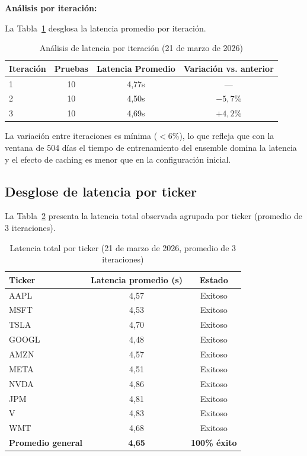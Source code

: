   \textbf{Análisis por iteración:}

  La Tabla~\ref{tab:iteraciones} desglosa la latencia promedio por iteración.

  \begin{table}[H]
  \centering
  \caption{Análisis de latencia por iteración (21 de marzo de 2026)}
  \label{tab:iteraciones}
  \begin{tabular}{lccc}
  \toprule
  \textbf{Iteración} & \textbf{Pruebas} & \textbf{Latencia Promedio} & \textbf{Variación vs.
  anterior} \\
  \midrule
  1 & 10 & 4{,}77s & --- \\
  2 & 10 & 4{,}50s & $-5{,}7\%$ \\
  3 & 10 & 4{,}69s & $+4{,}2\%$ \\
  \bottomrule
  \end{tabular}
  \end{table}

  La variación entre iteraciones es mínima ($<$6\%), lo que refleja que con la ventana de
  504 días el tiempo de entrenamiento del ensemble domina la latencia y el efecto de caching
  es menor que en la configuración inicial.

\subsection{Desglose de latencia por ticker}

  La Tabla~\ref{tab:latencia-componentes} presenta la latencia total observada agrupada por
  ticker (promedio de 3 iteraciones).

  \begin{table}[H]
  \centering
  \caption{Latencia total por ticker (21 de marzo de 2026, promedio de 3 iteraciones)}
  \label{tab:latencia-componentes}
  \begin{tabular}{lcc}
  \toprule
  \textbf{Ticker} & \textbf{Latencia promedio (s)} & \textbf{Estado} \\
  \midrule
  AAPL  & 4{,}57 & Exitoso \\
  MSFT  & 4{,}53 & Exitoso \\
  TSLA  & 4{,}70 & Exitoso \\
  GOOGL & 4{,}48 & Exitoso \\
  AMZN  & 4{,}57 & Exitoso \\
  META  & 4{,}51 & Exitoso \\
  NVDA  & 4{,}86 & Exitoso \\
  JPM   & 4{,}81 & Exitoso \\
  V     & 4{,}83 & Exitoso \\
  WMT   & 4{,}68 & Exitoso \\
  \midrule
  \textbf{Promedio general} & \textbf{4{,}65} & \textbf{100\% éxito} \\
  \bottomrule
  \end{tabular}
  \end{table}

